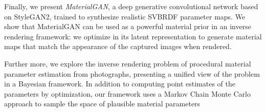 {  Finally, we present \emph{MaterialGAN}, a deep generative convolutional network based on StyleGAN2, trained to synthesize realistic SVBRDF parameter maps. We show that MaterialGAN can be used as a powerful material prior in an inverse rendering framework: we optimize in its latent representation to generate material maps that match the appearance of the captured images when rendered. 
  
  Further more, we explore the inverse rendering problem of procedural material parameter estimation from photographs, presenting a unified view of the problem in a Bayesian framework. In addition to computing point estimates of the parameters by optimization, our framework uses a Markov Chain Monte Carlo approach to sample the space of plausible material parameters
}


